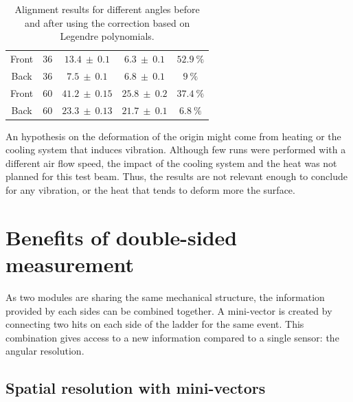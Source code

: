 \begin{table}
\begin{tabular}{|c|c|c|c|c|}
          Front &      36       & $ 13.4 \ \pm \ 0.1 $ & $ 6.3 \ \pm \ 0.1 $ &    $52.9 \ \%$               \\
          Back  &      36       & $ 7.5 \ \pm \ 0.1 $ & $ 6.8 \ \pm \ 0.1 $ &    $9 \ \%$          \\
          \hline %
          Front &      60       & $ 41.2 \ \pm \ 0.15$ & $25.8 \ \pm \ 0.2$  &    $37.4 \ \%$              \\
          Back  &      60       & $ 23.3 \ \pm \ 0.13$ & $21.7 \ \pm \ 0.1$  &    $6.8 \ \%$           \\
          \hline %
        \end{tabular}
        \caption{Alignment results for different angles before and after using the correction based on Legendre polynomials.}
        \label{tab:correctionOfDeformation}
      \end{table}

      An hypothesis on the deformation of the origin might come from heating or the cooling system that induces vibration.
      Although few runs were performed with a different air flow speed, the impact of the cooling system and the heat was not planned for this test beam.
      Thus, the results are not relevant enough to conclude for any vibration, or the heat that tends to deform more the surface.
    
  \section{Benefits of double-sided measurement}
  
  As two modules are sharing the same mechanical structure, the information provided by each sides can be combined together.
  A mini-vector is created by connecting two hits on each side of the ladder for the same event.
  This combination gives access to a new information compared to a single sensor: the angular resolution.

    \subsection{Spatial resolution with mini-vectors}

